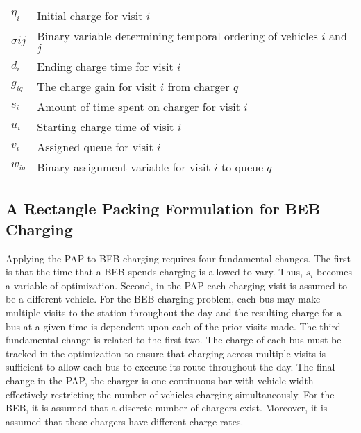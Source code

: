 \documentclass[11pt,a4paper,final]{article}
\begin{document}
\begin{table}[!htpb]
\begin{tabularx}{\textwidth}{l l}
    $\eta_i$    & Initial charge for visit $i$                                                                                \\
    $\sigma{ij}$ & Binary variable determining temporal ordering of vehicles $i$ and $j$                                       \\
    $d_i$    & Ending charge time for visit $i$                                                                            \\
    $g_{iq}$ & The charge gain for visit $i$ from charger $q$                                                              \\
    $s_i$    & Amount of time spent on charger for visit $i$                                                               \\
    $u_i$    & Starting charge time of visit $i$                                                                           \\
    $v_i$    & Assigned queue for visit $i$                                                                                \\
    $w_{iq}$ & Binary assignment variable for visit $i$ to queue $q$                                                       \\
    \bottomrule
  \end{tabularx}
\end{table}

\subsection{A Rectangle Packing Formulation for BEB Charging}
\label{sec:problemformulation}
Applying the PAP to BEB charging requires four fundamental changes. The first is that the time that a BEB spends
charging is allowed to vary. Thus, \(s_i\) becomes a variable of optimization. Second, in the PAP each charging visit is
assumed to be a different vehicle. For the BEB charging problem, each bus may make multiple visits to the station
throughout the day and the resulting charge for a bus at a given time is dependent upon each of the prior visits made.
The third fundamental change is related to the first two. The charge of each bus must be tracked in
the optimization to ensure that charging across multiple visits is sufficient to allow each bus to execute its route throughout the day.
The final change in the PAP, the charger is one continuous bar with vehicle width effectively restricting the number of vehicles
charging simultaneously. For the BEB, it is assumed that a discrete number of chargers exist. Moreover, it is assumed
that these chargers have different charge rates.
\end{document}
